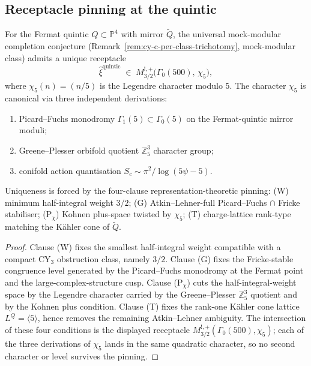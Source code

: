 \subsection{Receptacle pinning at the quintic}
\label{subsec:quintic-receptacle-pinning}

\begin{theorem}
\label{thm:quintic-receptacle-pinning}
For the Fermat quintic $Q \subset \mathbb{P}^4$ with mirror $\widetilde{Q}$,
the universal mock-modular completion conjecture
\textup{(}Remark~\ref{rem:cy-c-per-class-trichotomy}, mock-modular class\textup{)}
admits a unique receptacle
\[
 \widehat{\xi}^{\mathrm{quintic}}
 \;\in\;
 M^{!,+}_{3/2}\bigl(\Gamma_0(500),\, \chi_5\bigr),
\]
where $\chi_5(n) = (n/5)$ is the Legendre character modulo $5$. The
character $\chi_5$ is canonical via three independent derivations:
\begin{enumerate}
\item Picard--Fuchs monodromy $\Gamma_1(5) \subset \Gamma_0(5)$ on the
 Fermat-quintic mirror moduli;
\item Greene--Plesser orbifold quotient $\mathbb{Z}_5^3$ character group;
\item conifold action quantisation $S_c \sim \pi^2 / \log(5\psi - 5)$.
\end{enumerate}
Uniqueness is forced by the four-clause representation-theoretic pinning:
\textup{(W)} minimum half-integral weight $3/2$;
\textup{(G)} Atkin--Lehner-full Picard--Fuchs $\cap$ Fricke stabiliser;
\textup{(P$_\chi$)} Kohnen plus-space twisted by $\chi_5$;
\textup{(T)} charge-lattice rank-type matching the K\"ahler cone of $\widetilde{Q}$.
\end{theorem}

\begin{proof}
Clause \textup{(W)} fixes the smallest half-integral weight compatible
with a compact CY$_3$ obstruction class, namely $3/2$. Clause
\textup{(G)} fixes the Fricke-stable congruence level generated by the
Picard--Fuchs monodromy at the Fermat point and the large-complex-structure
cusp. Clause \textup{(P$_\chi$)} cuts the half-integral-weight space by
the Legendre character carried by the Greene--Plesser $\mathbb{Z}_5^3$
quotient and by the Kohnen plus condition. Clause \textup{(T)} fixes
the rank-one K\"ahler cone lattice $L^Q=\langle 5\rangle$, hence removes
the remaining Atkin--Lehner ambiguity. The intersection of these four
conditions is the displayed receptacle
$M^{!,+}_{3/2}(\Gamma_0(500),\chi_5)$; each of the three derivations of
$\chi_5$ lands in the same quadratic character, so no second character
or level survives the pinning.
\end{proof}

